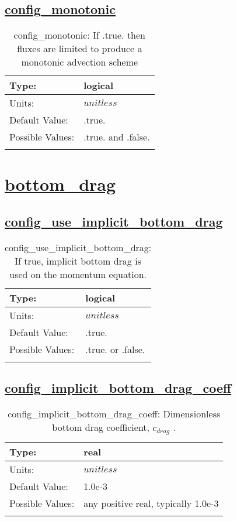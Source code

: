 \subsection[config\_monotonic]{\hyperref[sec:nm_tab_advection]{config\_monotonic}}
\label{subsec:nm_sec_config_monotonic}
\begin{center}
\begin{longtable}{| p{2.0in} || p{4.0in} |}
    \hline
    Type: & logical \\
    \hline
    Units: & $unitless$ \\
    \hline
    Default Value: & .true. \\
    \hline
    Possible Values: & .true. and .false. \\
    \hline
    \caption{config\_monotonic: If .true. then fluxes are limited to produce a monotonic advection scheme}
\end{longtable}
\end{center}
\section[bottom\_drag]{\hyperref[sec:nm_tab_bottom_drag]{bottom\_drag}}
\label{sec:nm_sec_bottom_drag}
\subsection[config\_use\_implicit\_bottom\_drag]{\hyperref[sec:nm_tab_bottom_drag]{config\_use\_implicit\_bottom\_drag}}
\label{subsec:nm_sec_config_use_implicit_bottom_drag}
\begin{center}
\begin{longtable}{| p{2.0in} || p{4.0in} |}
    \hline
    Type: & logical \\
    \hline
    Units: & $unitless$ \\
    \hline
    Default Value: & .true. \\
    \hline
    Possible Values: & .true. or .false. \\
    \hline
    \caption{config\_use\_implicit\_bottom\_drag: If true, implicit bottom drag is used on the momentum equation.}
\end{longtable}
\end{center}
\subsection[config\_implicit\_bottom\_drag\_coeff]{\hyperref[sec:nm_tab_bottom_drag]{config\_implicit\_bottom\_drag\_coeff}}
\label{subsec:nm_sec_config_implicit_bottom_drag_coeff}
\begin{center}
\begin{longtable}{| p{2.0in} || p{4.0in} |}
    \hline
    Type: & real \\
    \hline
    Units: & $unitless$ \\
    \hline
    Default Value: & 1.0e-3 \\
    \hline
    Possible Values: & any positive real, typically 1.0e-3 \\
    \hline
    \caption{config\_implicit\_bottom\_drag\_coeff:  Dimensionless bottom drag coefficient,  $c_{drag}$ .}
\end{longtable}
\end{center}
